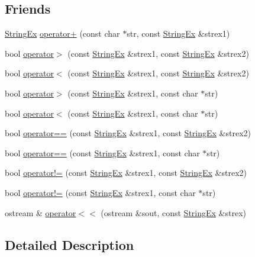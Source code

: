 \subsection*{Friends}
\begin{CompactItemize}
\item 
\hyperlink{classStringEx}{StringEx} \hyperlink{classStringEx_89a13eb6dc9b0f923d3eab8b0d2dc841}{operator+} (const char $\ast$str, const \hyperlink{classStringEx}{StringEx} \&strex1)
\item 
bool \hyperlink{classStringEx_0352cabe898a856bb669a52b291f2b0c}{operator$>$} (const \hyperlink{classStringEx}{StringEx} \&strex1, const \hyperlink{classStringEx}{StringEx} \&strex2)
\item 
bool \hyperlink{classStringEx_8ad4eaa758cf41431e7ad34e253fda8e}{operator$<$} (const \hyperlink{classStringEx}{StringEx} \&strex1, const \hyperlink{classStringEx}{StringEx} \&strex2)
\item 
bool \hyperlink{classStringEx_50626126af7fa40dffff0b4011023fce}{operator$>$} (const \hyperlink{classStringEx}{StringEx} \&strex1, const char $\ast$str)
\item 
bool \hyperlink{classStringEx_193dfbca89ee16ca8cf8d70e4203487b}{operator$<$} (const \hyperlink{classStringEx}{StringEx} \&strex1, const char $\ast$str)
\item 
bool \hyperlink{classStringEx_73912fae5fd55593d41c26b62a165e69}{operator==} (const \hyperlink{classStringEx}{StringEx} \&strex1, const \hyperlink{classStringEx}{StringEx} \&strex2)
\item 
bool \hyperlink{classStringEx_529ca0692be82a0d7713aef9dc6b5034}{operator==} (const \hyperlink{classStringEx}{StringEx} \&strex1, const char $\ast$str)
\item 
bool \hyperlink{classStringEx_be1be1e9825319fd3dc71dea82d42ad0}{operator!=} (const \hyperlink{classStringEx}{StringEx} \&strex1, const \hyperlink{classStringEx}{StringEx} \&strex2)
\item 
bool \hyperlink{classStringEx_5fd76bfce367d9e3f30b22169ffcb629}{operator!=} (const \hyperlink{classStringEx}{StringEx} \&strex1, const char $\ast$str)
\item 
ostream \& \hyperlink{classStringEx_d356a5f383f559309131d50ba6363d8a}{operator$<$$<$} (ostream \&sout, const \hyperlink{classStringEx}{StringEx} \&strex)
\end{CompactItemize}


\subsection{Detailed Description}


